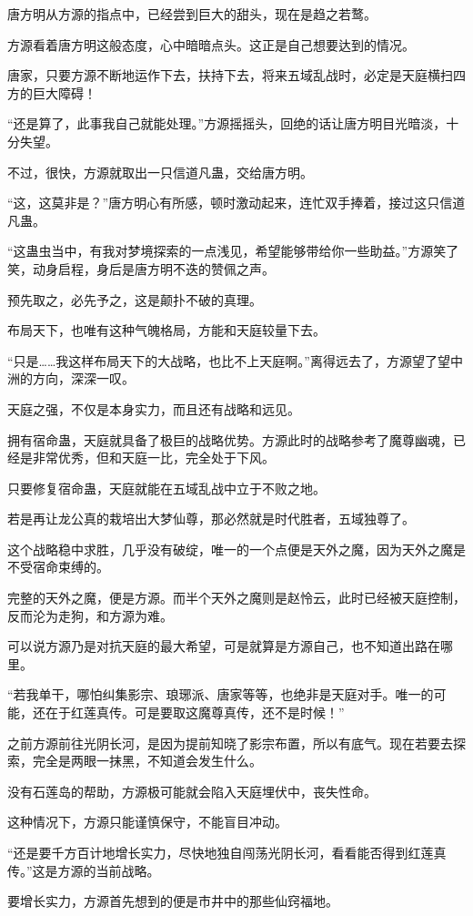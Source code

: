 \begin{this_body}
唐方明从方源的指点中，已经尝到巨大的甜头，现在是趋之若鹜。

方源看着唐方明这般态度，心中暗暗点头。这正是自己想要达到的情况。

唐家，只要方源不断地运作下去，扶持下去，将来五域乱战时，必定是天庭横扫四方的巨大障碍！

“还是算了，此事我自己就能处理。”方源摇摇头，回绝的话让唐方明目光暗淡，十分失望。

不过，很快，方源就取出一只信道凡蛊，交给唐方明。

“这，这莫非是？”唐方明心有所感，顿时激动起来，连忙双手捧着，接过这只信道凡蛊。

“这蛊虫当中，有我对梦境探索的一点浅见，希望能够带给你一些助益。”方源笑了笑，动身启程，身后是唐方明不迭的赞佩之声。

预先取之，必先予之，这是颠扑不破的真理。

布局天下，也唯有这种气魄格局，方能和天庭较量下去。

“只是……我这样布局天下的大战略，也比不上天庭啊。”离得远去了，方源望了望中洲的方向，深深一叹。

天庭之强，不仅是本身实力，而且还有战略和远见。

拥有宿命蛊，天庭就具备了极巨的战略优势。方源此时的战略参考了魔尊幽魂，已经是非常优秀，但和天庭一比，完全处于下风。

只要修复宿命蛊，天庭就能在五域乱战中立于不败之地。

若是再让龙公真的栽培出大梦仙尊，那必然就是时代胜者，五域独尊了。

这个战略稳中求胜，几乎没有破绽，唯一的一个点便是天外之魔，因为天外之魔是不受宿命束缚的。

完整的天外之魔，便是方源。而半个天外之魔则是赵怜云，此时已经被天庭控制，反而沦为走狗，和方源为难。

可以说方源乃是对抗天庭的最大希望，可是就算是方源自己，也不知道出路在哪里。

“若我单干，哪怕纠集影宗、琅琊派、唐家等等，也绝非是天庭对手。唯一的可能，还在于红莲真传。可是要取这魔尊真传，还不是时候！”

之前方源前往光阴长河，是因为提前知晓了影宗布置，所以有底气。现在若要去探索，完全是两眼一抹黑，不知道会发生什么。

没有石莲岛的帮助，方源极可能就会陷入天庭埋伏中，丧失性命。

这种情况下，方源只能谨慎保守，不能盲目冲动。

“还是要千方百计地增长实力，尽快地独自闯荡光阴长河，看看能否得到红莲真传。”这是方源的当前战略。

要增长实力，方源首先想到的便是市井中的那些仙窍福地。


\end{this_body}
